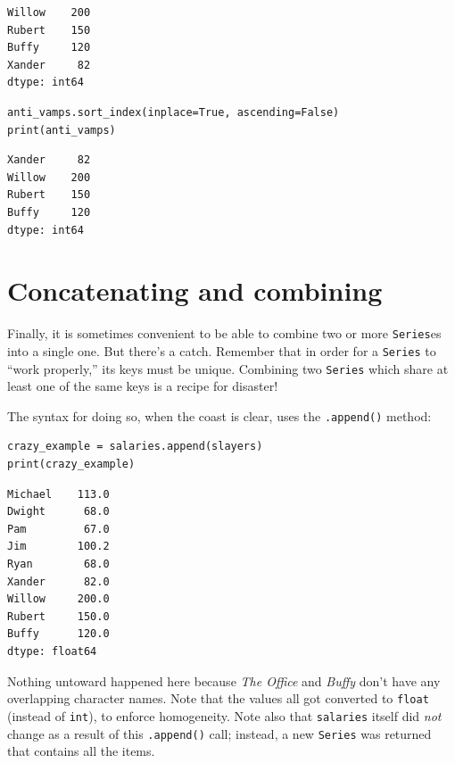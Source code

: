 \begin{Verbatim}[fontsize=\small,samepage=true,frame=leftline,framesep=5mm,framerule=1mm]
Willow    200
Rubert    150
Buffy     120
Xander     82
dtype: int64
\end{Verbatim}

\begin{Verbatim}[fontsize=\small,samepage=true,frame=single,framesep=3mm]
anti_vamps.sort_index(inplace=True, ascending=False)
print(anti_vamps)
\end{Verbatim}
\vspace{-.3in}

\begin{Verbatim}[fontsize=\small,samepage=true,frame=leftline,framesep=5mm,framerule=1mm]
Xander     82
Willow    200
Rubert    150
Buffy     120
dtype: int64
\end{Verbatim}

\section{Concatenating and combining}

Finally, it is sometimes convenient to be able to combine two or more
\texttt{Series}es into a single one. But there's a catch. Remember that in
order for a \texttt{Series} to ``work properly,'' its keys must be unique.
Combining two \texttt{Series} which share at least one of the same keys is a
recipe for disaster!

The syntax for doing so, when the coast is clear, uses the \texttt{.append()}
method:

\begin{Verbatim}[fontsize=\small,samepage=true,frame=single,framesep=3mm]
crazy_example = salaries.append(slayers)
print(crazy_example)
\end{Verbatim}
\vspace{-.3in}

\begin{Verbatim}[fontsize=\small,samepage=true,frame=leftline,framesep=5mm,framerule=1mm]
Michael    113.0
Dwight      68.0
Pam         67.0
Jim        100.2
Ryan        68.0
Xander      82.0
Willow     200.0
Rubert     150.0
Buffy      120.0
dtype: float64
\end{Verbatim}

Nothing untoward happened here because \textit{The Office} and \textit{Buffy}
don't have any overlapping character names. Note that the values all got
converted to \texttt{float} (instead of \texttt{int}), to enforce homogeneity.
Note also that \texttt{salaries} itself did \textit{not} change as a result of
this \texttt{.append()} call; instead, a new \texttt{Series} was returned that
contains all the items.


